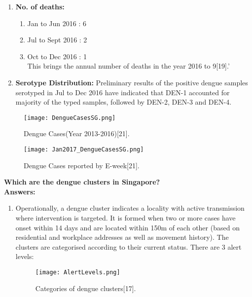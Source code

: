 \documentclass[11pt]{exam}
\begin{document}
\begin{questions}
\begin{enumerate}
\item \textbf{No. of deaths:}\begin{enumerate} \item Jan to Jun 2016 : 6 
                          \item Jul to Sept 2016 : 2 
                          \item Oct to Dec 2016 : 1 \\
This brings the annual number of deaths in the year 2016 to 9[19].'
\end{enumerate}                           
\item \textbf{Serotype Distribution:} Preliminary results of the positive dengue samples serotyped in Jul to Dec 2016 have indicated that DEN-1 accounted for majority of the typed samples, followed by DEN-2, DEN-3 and DEN-4. 
\end{enumerate}
\begin{figure}[H]
  \centering
   \texttt{[image: DengueCasesSG.png]}
  \caption{Dengue Cases(Year 2013-2016)[21].}
   \label{Dengue Cases in Singapore 2013-2017}
\end{figure} 

\begin{figure}[H]
  \centering
   \texttt{[image: Jan2017\_DengueCasesSG.png]}
  \caption{Dengue Cases reported by E-week[21].} %
   \label{Dengue Cases reported by E-week}
\end{figure} 


%    

\newpage
\question
\label{15. Dengue: Hotspots in Singapore}
\textbf{Which are the dengue clusters in Singapore?} \\
\textbf{Answers:}\\
\begin{enumerate}
\item Operationally, a dengue cluster indicates a locality with active transmission where intervention is targeted.  It is formed when two or more cases have onset within 14 days and are located within 150m of each other (based on residential and workplace addresses as well as movement history). The clusters are categorised according to their current status. There are 3 alert levels:
\begin{figure}[H]
  \centering
   \texttt{[image: AlertLevels.png]}
  \caption{Categories of dengue clusters[17].}
   \label{fig:Categories of dengue clusters. }
\end{figure} 


\end{enumerate}
\end{questions}
\end{document}
